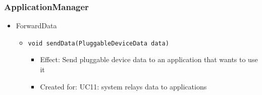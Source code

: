     \subsubsection{ApplicationManager}
        \begin{itemize}
            \item ForwardData
            \begin{itemize}
                \item \texttt{void sendData(PluggableDeviceData data)}
                \begin{itemize}
                    \item Effect: Send pluggable device data to an application that wants to use it
                    \item Created for: UC11: system relays data to applications \\
                \end{itemize}
            \end{itemize}
        \end{itemize}

